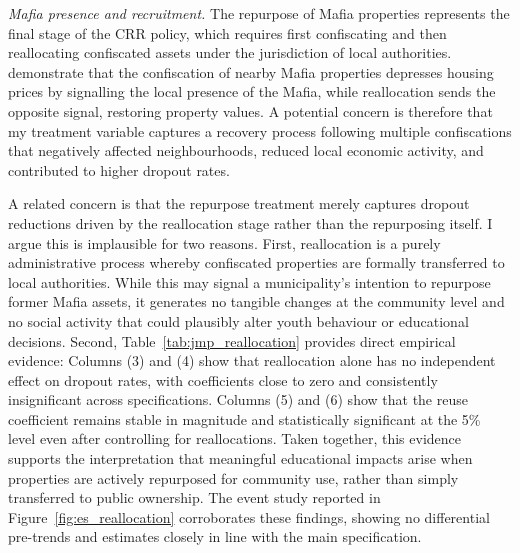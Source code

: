 \documentclass[12pt]{article}
\theoremstyle{plain}
\theoremstyle{plain}
\theoremstyle{plain}
\theoremstyle{definition}
\theoremstyle{plain}
\theoremstyle{definition}
\theoremstyle{plain}
\theoremstyle{remark}
\theoremstyle{definition}
\theoremstyle{definition}
\theoremstyle{plain}
\begin{document}
\emph{Mafia presence and recruitment.} The repurpose of Mafia properties represents the final stage of the CRR policy, which requires first confiscating and then reallocating confiscated assets under the jurisdiction of local authorities. \citet{boeri_localized_2023} demonstrate that the confiscation of nearby Mafia properties depresses housing prices by signalling the local presence of the Mafia, while reallocation sends the opposite signal, restoring property values. A potential concern is therefore that my treatment variable captures a recovery process following multiple confiscations that negatively affected neighbourhoods, reduced local economic activity, and contributed to higher dropout rates.
\par\medskip
A related concern is that the repurpose treatment merely captures dropout reductions driven by the reallocation stage rather than the repurposing itself. I argue this is implausible for two reasons. First, reallocation is a purely administrative process whereby confiscated properties are formally transferred to local authorities. While this may signal a municipality's intention to repurpose former Mafia assets, it generates no tangible changes at the community level and no social activity that could plausibly alter youth behaviour or educational decisions. Second, Table~\ref{tab:jmp_reallocation} provides direct empirical evidence: Columns (3) and (4) show that reallocation alone has no independent effect on dropout rates, with coefficients close to zero and consistently insignificant across specifications. Columns (5) and (6) show that the reuse coefficient remains stable in magnitude and statistically significant at the 5\% level even after controlling for reallocations. Taken together, this evidence supports the interpretation that meaningful educational impacts arise when properties are actively repurposed for community use, rather than simply transferred to public ownership. The event study reported in Figure~\ref{fig:es_reallocation} corroborates these findings, showing no differential pre-trends and estimates closely in line with the main specification.
\end{document}
